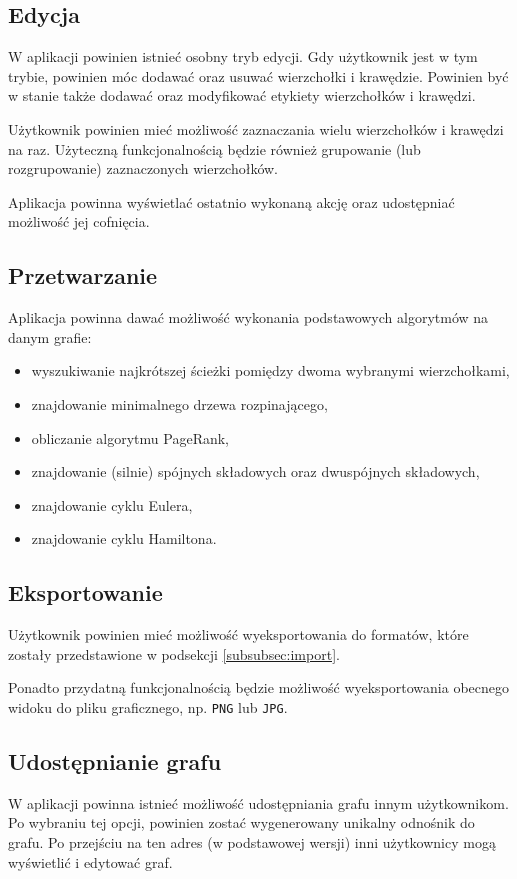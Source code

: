 \subsection{Edycja}

W aplikacji powinien istnieć osobny tryb edycji. Gdy użytkownik jest w tym trybie, powinien móc dodawać oraz usuwać wierzchołki i krawędzie. Powinien być w stanie także dodawać oraz modyfikować etykiety wierzchołków i krawędzi.

Użytkownik powinien mieć możliwość zaznaczania wielu wierzchołków i krawędzi na raz. Użyteczną funkcjonalnością będzie również grupowanie (lub rozgrupowanie) zaznaczonych wierzchołków. 

Aplikacja powinna wyświetlać ostatnio wykonaną akcję oraz udostępniać możliwość jej cofnięcia.

\subsection{Przetwarzanie}

Aplikacja powinna dawać możliwość wykonania podstawowych algorytmów na danym grafie:

\begin{itemize}
\setlength\itemsep{0em}
\item wyszukiwanie najkrótszej ścieżki pomiędzy dwoma wybranymi wierzchołkami,
\item znajdowanie minimalnego drzewa rozpinającego,
\item obliczanie algorytmu PageRank,
\item znajdowanie (silnie) spójnych składowych oraz dwuspójnych składowych,
\item znajdowanie cyklu Eulera,
\item znajdowanie cyklu Hamiltona.
\end{itemize}

\subsection{Eksportowanie}
Użytkownik powinien mieć możliwość wyeksportowania do formatów, które zostały przedstawione w podsekcji \ref{subsubsec:import}. 

Ponadto przydatną funkcjonalnością będzie możliwość wyeksportowania obecnego widoku do pliku graficznego, np. \texttt{PNG} lub \texttt{JPG}. 

\subsection{Udostępnianie grafu}
W aplikacji powinna istnieć możliwość udostępniania grafu innym użytkownikom. Po wybraniu tej opcji, powinien zostać wygenerowany unikalny odnośnik do grafu. Po przejściu na ten adres (w podstawowej wersji) inni użytkownicy mogą wyświetlić i edytować graf.


